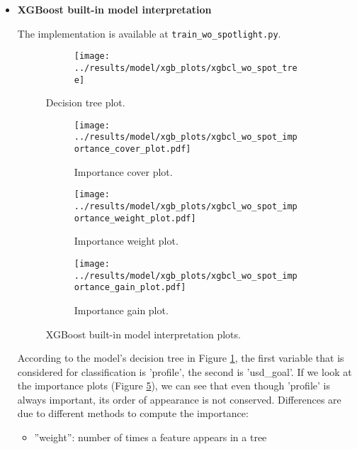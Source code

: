\documentclass{article}
\begin{document}
\begin{itemize}
\item \textbf{XGBoost built-in model interpretation}

The implementation is available at {\tt train\_wo\_spotlight.py}.

\begin{figure}
  \begin{subfigure}{1\linewidth}
    \centering\texttt{[image: ../results/model/xgb\_plots/xgbcl\_wo\_spot\_tree]}
  \end{subfigure}
\caption{Decision tree plot.}
\label{fig:tree}
\end{figure}

\begin{figure}

  \begin{subfigure}[a]{0.5\linewidth}
    \centering\texttt{[image: ../results/model/xgb\_plots/xgbcl\_wo\_spot\_importance\_cover\_plot.pdf]}
    \caption{Importance cover plot.}
    \label{fig:cover}
  \end{subfigure}
 
  \begin{subfigure}[b]{0.5\linewidth}
    \centering\texttt{[image: ../results/model/xgb\_plots/xgbcl\_wo\_spot\_importance\_weight\_plot.pdf]}
    \caption{Importance weight plot.}
    \label{fig:weight}
  \end{subfigure}
  
   \begin{subfigure}[c]{0.5\linewidth}
    \centering\texttt{[image: ../results/model/xgb\_plots/xgbcl\_wo\_spot\_importance\_gain\_plot.pdf]}
    \caption{Importance gain plot.}
    \label{fig:gain}
  \end{subfigure}
\caption{XGBoost built-in model interpretation plots.}
\label{fig:xgb_int}
\end{figure}

According to the model's decision tree in Figure \ref{fig:tree}, the first variable that is considered for classification is 'profile', the second is 'usd\_goal'. If we look at the importance plots (Figure \ref{fig:xgb_int}), we can see that even though 'profile' is always important, its order of appearance is not conserved. Differences are due to different methods to compute the importance:
\begin{itemize}

\item ”weight”: number of times a feature appears in a tree


\end{itemize}
\end{itemize}
\end{document}

